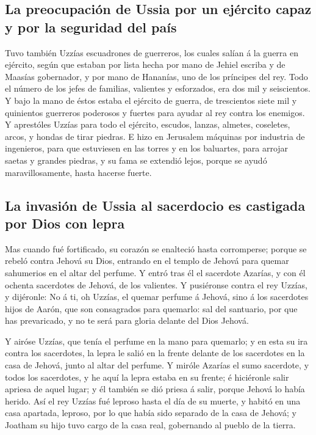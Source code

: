 \hypertarget{la-preocupaciuxf3n-de-ussia-por-un-ejuxe9rcito-capaz-y-por-la-seguridad-del-pauxeds}{%
\subsection{La preocupación de Ussia por un ejército capaz y por la
seguridad del
país}\label{la-preocupaciuxf3n-de-ussia-por-un-ejuxe9rcito-capaz-y-por-la-seguridad-del-pauxeds}}

 Tuvo también Uzzías escuadrones de guerreros, los cuales
salían á la guerra en ejército, según que estaban por lista hecha por
mano de Jehiel escriba y de Maasías gobernador, y por mano de Hananías,
uno de los príncipes del rey.  Todo el número de los jefes
de familias, valientes y esforzados, era dos mil y seiscientos.
 Y bajo la mano de éstos estaba el ejército de guerra, de
trescientos siete mil y quinientos guerreros poderosos y fuertes para
ayudar al rey contra los enemigos.  Y aprestóles Uzzías
para todo el ejército, escudos, lanzas, almetes, coseletes, arcos, y
hondas de tirar piedras.  E hizo en Jerusalem máquinas por
industria de ingenieros, para que estuviesen en las torres y en los
baluartes, para arrojar saetas y grandes piedras, y su fama se extendió
lejos, porque se ayudó maravillosamente, hasta hacerse fuerte.

\hypertarget{la-invasiuxf3n-de-ussia-al-sacerdocio-es-castigada-por-dios-con-lepra}{%
\subsection{La invasión de Ussia al sacerdocio es castigada por Dios con
lepra}\label{la-invasiuxf3n-de-ussia-al-sacerdocio-es-castigada-por-dios-con-lepra}}

 Mas cuando fué fortificado, su corazón se enalteció hasta
corromperse; porque se rebeló contra Jehová su Dios, entrando en el
templo de Jehová para quemar sahumerios en el altar del perfume.
 Y entró tras él el sacerdote Azarías, y con él ochenta
sacerdotes de Jehová, de los valientes.  Y pusiéronse
contra el rey Uzzías, y dijéronle: No á ti, oh Uzzías, el quemar perfume
á Jehová, sino á los sacerdotes hijos de Aarón, que son consagrados para
quemarlo: sal del santuario, por que has prevaricado, y no te será para
gloria delante del Dios Jehová.

 Y airóse Uzzías, que tenía el perfume en la mano para
quemarlo; y en esta su ira contra los sacerdotes, la lepra le salió en
la frente delante de los sacerdotes en la casa de Jehová, junto al altar
del perfume.  Y miróle Azarías el sumo sacerdote, y todos
los sacerdotes, y he aquí la lepra estaba en su frente; é hiciéronle
salir apriesa de aquel lugar; y él también se dió priesa á salir, porque
Jehová lo había herido.  Así el rey Uzzías fué leproso
hasta el día de su muerte, y habitó en una casa apartada, leproso, por
lo que había sido separado de la casa de Jehová; y Joatham su hijo tuvo
cargo de la casa real, gobernando al pueblo de la tierra.

